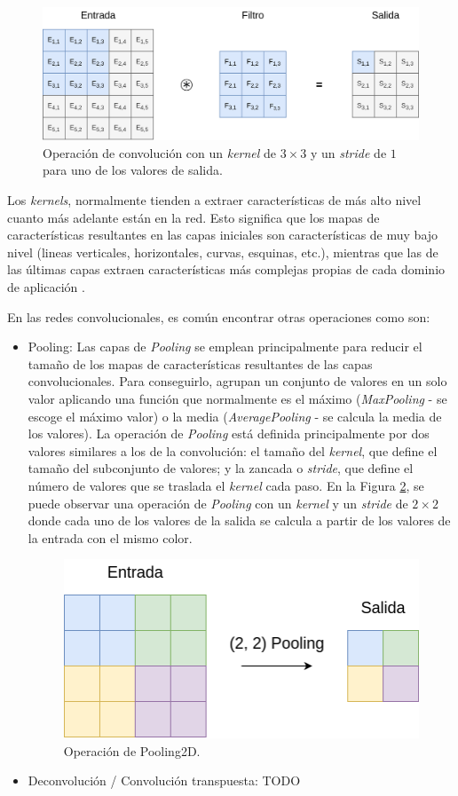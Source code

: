 \begin{figure}[H]
\centering
\includegraphics[width=0.8\linewidth]{imagenes/convolucion.png} 
\captionsetup{width=.8\linewidth}
\caption{Operación de convolución con un \textit{kernel} de $3\times3$ y un \textit{stride} de $1$ para uno de los valores de salida.}
\label{fig:convolucion}
\end{figure}

Los \textit{kernels}, normalmente tienden a extraer características de más alto nivel cuanto más adelante están en la red. Esto significa que los mapas de características resultantes en las capas iniciales son características de muy bajo nivel (lineas verticales, horizontales, curvas, esquinas, etc.), mientras que las de las últimas capas extraen características más complejas propias de cada dominio de aplicación \cite{Visualizing and Understanding Convolutional Networks}.

En las redes convolucionales, es común encontrar otras operaciones como son:
\begin{itemize}
\item Pooling: Las capas de \textit{Pooling} se emplean principalmente para reducir el tamaño de los mapas de características resultantes de las capas convolucionales. Para conseguirlo, agrupan un conjunto de valores en un solo valor aplicando una función que normalmente es el máximo (\textit{MaxPooling} - se escoge el máximo valor) o la media (\textit{AveragePooling} - se calcula la media de los valores). La operación de \textit{Pooling} está definida principalmente por dos valores similares a los de la convolución: el tamaño del \textit{kernel}, que define el tamaño del subconjunto de valores; y la zancada o \textit{stride}, que define el número de valores que se traslada el \textit{kernel} cada paso. En la Figura \ref{fig:pooling}, se puede observar una operación de \textit{Pooling} con un \textit{kernel} y un \textit{stride} de $2\times2$ donde cada uno de los valores de la salida se calcula a partir de los valores de la entrada con el mismo color.

\begin{figure}[H]
\centering
\includegraphics[width=0.5\linewidth]{imagenes/pooling.png} 
\captionsetup{width=.5\linewidth}
\caption{Operación de Pooling2D.}
\label{fig:pooling}
\end{figure}

\item Deconvolución / Convolución transpuesta: TODO
\end{itemize}

